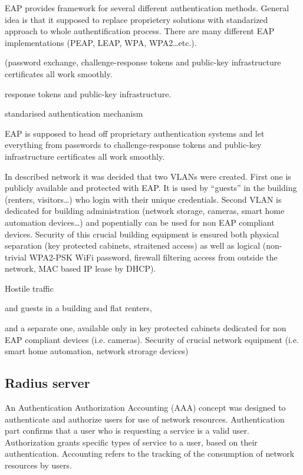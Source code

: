 \documentclass{llncs}
\begin{document}
EAP provides framework for several different authentication methods. General
idea is that it supposed to replace proprietery solutions with standarized
approach to whole authentification process. There are many different EAP
implementations (PEAP, LEAP, WPA, WPA2\ldots etc.).


 (password exchange,
challenge-response tokens and public-key infrastructure certificates all work smoothly.

 response tokens and public-key infrastructure.


standarised authentication mechanism

 EAP is supposed to head off
proprietary authentication systems and let everything from passwords to challenge-response tokens and public-key
infrastructure certificates all work smoothly.

In described network it was decided that two VLANs were created. First one is
publicly available and protected with EAP. It is used by ``guests'' in the building
(renters, visitors\ldots) who login with their unique credentials. Second VLAN
is dedicated for building administration (network storage, cameras, smart home
automation devices\ldots) and popentially can be used for non EAP compliant
devices. Security of this crucial building equipment is ensured both physical
separation (key protected cabinets, straitened access) as well as logical
(non-trivial WPA2-PSK WiFi password, firewall filtering access from outside the
network, MAC based IP lease by DHCP). 

Hostile traffic

and guests in a building and
flat renters,

 and a separate one, available only in
key protected cabinets dedicated for non EAP compliant devices (i.e. cameras).
Security of crucial network equipment (i.e. smart home automation, network
strorage devices)
 


\subsection{Radius server}
An Authentication Authorization Accounting (AAA) \cite{rfc2903}\cite{rfc2904}
concept was designed to authenticate and authorize users for use of network
resources. Authentication part confirms that a user who is requesting a service
is a valid user. Authorization grants specific types of service to a user, based
on their authentication. Accounting refers to the tracking of the consumption of
network resources by users.
\end{document}
